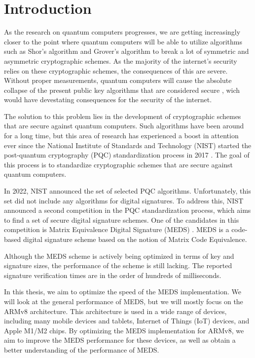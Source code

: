 \documentclass[11pt,a4paper]{report}
\begin{document}


\tableofcontents
\newpage

\chapter{Introduction}
\label{ch:introduction}
As the research on quantum computers progresses, we are getting increasingly closer to the point where quantum computers will be able to utilize algorithms such as Shor's algorithm and Grover's algorithm to break a lot of symmetric and asymmetric cryptographic schemes. As the majority of the internet's security relies on these cryptographic schemes, the consequences of this are severe. Without proper measurements, quantum computers will cause the absolute collapse of the present public key algorithms that are considered secure \cite{mavroeidis2018impact}, wich would have devestating consequences for the security of the internet.

The solution to this problem lies in the development of cryptographic schemes that are secure against quantum computers. Such algorithms have been around for a long time, but this area of research has experienced a boost in attention ever since the National Institute of Standards and Technology (NIST) started the post-quantum cryptography (PQC) standardization process in 2017 \cite{nist2017pqc}. The goal of this process is to standardize cryptographic schemes that are secure against quantum computers.

In 2022, NIST announced the set of selected PQC algorithms. Unfortunately, this set did not include any algorithms for digital signatures. To address this, NIST announced a second competition in the PQC standardization process, which aims to find a set of secure digital signature schemes. One of the candidates in this competition is Matrix Equivalence Digital Signature (MEDS) \cite{chou2023take}. MEDS is a code-based digital signature scheme based on the notion of Matrix Code Equivalence.

Although the MEDS scheme is actively being optimized in terms of key and signature sizes, the performance of the scheme is still lacking. The reported signature verification times are in the order of hundreds of milliseconds. 

In this thesis, we aim to optimize the speed of the MEDS implementation. We will look at the general performance of MEDS, but we will mostly focus on the ARMv8 architecture. This architecture is used in a wide range of devices, including many mobile devices and tablets, Internet of Things (IoT) devices, and Apple M1/M2 chips. By optimizing the MEDS implementation for ARMv8, we aim to improve the MEDS performance for these devices, as well as obtain a better understanding of the performance of MEDS.
\end{document}
